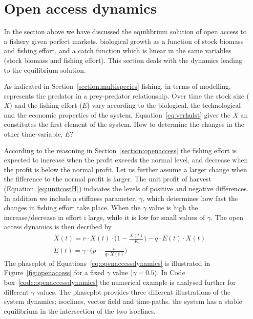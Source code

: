 \documentclass[11pt,fleqn]{book} %
\begin{document}
\section{Open access dynamics}
In the section above we have discussed the equilibrium solution of open access to a fishery given perfect markets, biological growth as a function of stock biomass and fishing effort, and a catch function which is linear in the same variables (stock biomass and fishing effort). This section deals with the dynamics leading to the equilibrium solution.

As indicated in Section~\ref{section:multispecies} fishing, in terms of modelling, represents the predator in a prey-predator relationship. Over time the stock size ($X$) and the fishing effort ($E$) vary according to the biological, the technological and the economic properties of the system. Equation~\ref{eq:verhulst} gives the $X$ an constitutes the first element of the system. How to determine the changes in the other time-variable, $E$?

According to the reasoning in Section~\ref{section:openaccess} the fishing effort is expected to increase when the profit exceeds the normal level, and decrease when the profit is below the normal profit. Let us further assume a larger change when the fifference to the normal profit is larger. The unit profit of harvest (Equation~\ref{eq:unitcostH}) indicates the levels of positive and negative differences. In addition we include a stiffness parameter, $\gamma$, which determines how fast the changes in fishing effort take place. When the $\gamma$ value is high the increase/decrease in effort i large, while it is low for small values of $\gamma$. The open access dynamics is then decribed by
\begin{equation}
\label{eq:openaccessdynamics}
\begin{aligned} & \dot{X}(t) = r \cdot X(t) \cdot \bigg(1 - \frac{X(t)}{K}\bigg) - q \cdot E(t) \cdot X(t) \\
& \dot{E}(t) = \gamma \cdot \bigg(p - \frac{a}{q \cdot X(t)}\bigg)
\end{aligned}
\end{equation}
The phaseplot of Equations~\ref{eq:openaccessdynamics} is illustrated in Figure~\ref{fig:openaccess} for a fixed $\gamma$ value ($\gamma = 0.5$). In Code box~\ref{code:openaccessdynamics} the numerical example is analysed further for different $\gamma$ values. The phaseplot provides three different illustrations of the system dynamics; isoclines, vector field and time-paths. the system has a stable equilibrium in the intersection of the two isoclines.
\end{document}
